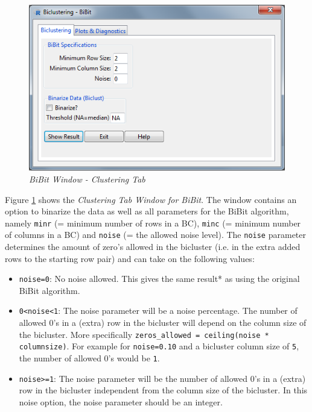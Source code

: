 \documentclass[a4paper]{article}\usepackage[]{graphicx}\usepackage[]{color}
\begin{document}
\begin{figure}[H]
\centering
\includegraphics[scale=0.5]{figures/bibit_clusttab.png}
\caption{{\it BiBit Window - Clustering Tab}\label{bibit_clusttab}}
\end{figure}

\noindent Figure \ref{bibit_clusttab} shows the {\it Clustering Tab Window for BiBit}. The window contains an option to binarize the data as well as all parameters for the BiBit algorithm, namely \texttt{minr} (= minimum number of rows in a BC), \texttt{minc} (= minimum number of columns in a BC) and \texttt{noise} (= the allowed noise level). The \texttt{noise} parameter determines the amount of zero's allowed in the bicluster (i.e. in the extra added rows to the starting row pair) and can take on the following values:
\begin{itemize}
\item \texttt{noise=0}: No noise allowed. This gives the same result* as using
the original BiBit algorithm.
\item \verb|0<noise<1|: The noise parameter will be a noise percentage.
The number of allowed 0's in a (extra) row in the bicluster will depend on the
column size of the bicluster. More specifically \texttt{zeros\_allowed = ceiling(noise * columnsize)}. For example for \texttt{noise=0.10} and a bicluster column size of \texttt{5}, the number of allowed 0's would be \texttt{1}.
\item \texttt{noise>=1}: The noise parameter will be the number of allowed 0's in a (extra) row in the bicluster independent from the column size of the bicluster. In this noise option, the noise parameter should be an integer.
\end{itemize}
\end{document}
